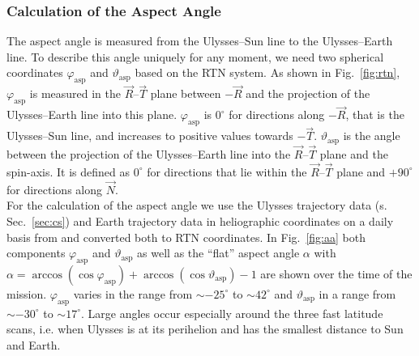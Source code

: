 \subsubsection{Calculation of the Aspect Angle}
The aspect angle is measured from the Ulysses--Sun line to the Ulysses--Earth line. To describe this angle uniquely for any moment, we need two spherical coordinates $\varphi_{\mathrm{asp}}$ and $\vartheta_{\mathrm{asp}}$ based on the RTN system. As shown in Fig.~\ref{fig:rtn}, $\varphi_{\mathrm{asp}}$ is measured in the $\vec{R}$--$\vec{T}$ plane between $-\vec{R}$ and the projection of the Ulysses--Earth line into this plane. $\varphi_{\mathrm{asp}}$  is $0^\circ$ for directions along $-\vec{R}$, that is the Ulysses--Sun line, and increases to positive values towards $-\vec{T}$. $\vartheta_{\mathrm{asp}}$ is the angle between the projection of the Ulysses--Earth line into the $\vec{R}$--$\vec{T}$ plane and the spin-axis. It is defined as $0^\circ$ for directions that lie within the $\vec{R}$--$\vec{T}$ plane and $+90^\circ$ for directions along $\vec{N}$.\\
For the calculation of the aspect angle we use the Ulysses trajectory data (s. Sec.~\ref{sec:cs}) and Earth trajectory data in heliographic coordinates on a daily basis from \citet{nasa-earth-coord} and converted both to RTN coordinates. In Fig.~\ref{fig:aa} both components $\varphi_{\mathrm{asp}}$ and $\vartheta_{\mathrm{asp}}$ as well as the ``flat'' aspect angle $\alpha$ with  $\alpha = \arccos(\cos{\varphi_{\mathrm{asp}}}) + \arccos(\cos{\vartheta_{\mathrm{asp}}}) -1$ are shown over the time of the mission. $\varphi_{\mathrm{asp}}$ varies in the range from $\sim - 25^\circ$ to $\sim 42^\circ$ and $\vartheta_{\mathrm{asp}}$ in a range from $\sim - 30^\circ$ to $\sim 17^\circ$. Large angles occur especially around the three fast latitude scans, i.e. when Ulysses is at its perihelion and has the smallest distance to Sun and Earth.

